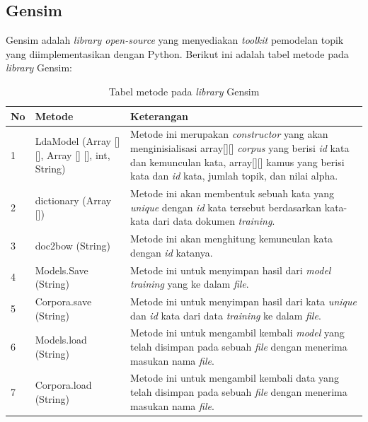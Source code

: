 \subsection{Gensim}
Gensim adalah \textit{library open-source} yang menyediakan \textit{
	toolkit }pemodelan topik yang diimplementasikan dengan Python. Berikut 
ini adalah tabel metode pada \textit{library} Gensim: 
\begin{table}[H]
	\caption{Tabel metode pada \textit{library} Gensim}
	\centering
	\small
	\begin{adjustbox}{width=1\textwidth}
	\begin{tabular}{|p{0.5cm}|p{6cm}|p{6cm}|}
		\hline
		\textbf{No} & \textbf{Metode} & \textbf{Keterangan} \\
		\hline
		1 & LdaModel (Array [] [], Array [] [], int, String) & 
		Metode ini merupakan \textit{constructor} yang akan menginisialisasi 
		array[][] \textit{corpus} yang berisi \textit{id} kata dan 
		kemunculan kata, array[][] kamus yang berisi kata dan \textit{
			id} kata, jumlah topik, dan nilai alpha. \\
		\hline
		2 & dictionary (Array []) & Metode ini akan membentuk sebuah kata 
		yang \textit{unique} dengan \textit{id} kata tersebut berdasarkan 
		kata-kata dari data dokumen \textit{training}. \\
		\hline
		3 & doc2bow (String) & Metode ini akan menghitung kemunculan kata dengan 
		\textit{id} katanya. \\
		\hline
		4 & Models.Save (String) & Metode ini untuk menyimpan hasil dari 
		\textit{model} \textit{training} yang ke dalam \textit{file}. \\
		\hline
		5 & Corpora.save (String) & Metode ini untuk menyimpan hasil dari kata 
		\textit{unique} dan \textit{id }kata dari data \textit{training }
		ke dalam \textit{file}. \\
		\hline
		6 & Models.load (String) & Metode ini untuk mengambil kembali \textit{
			model} yang telah disimpan pada sebuah \textit{file }dengan menerima 
		masukan nama \textit{file}. \\
		\hline
		7 & Corpora.load (String) & Metode ini untuk mengambil kembali data yang 
		telah disimpan pada sebuah \textit{file }dengan menerima masukan nama 
		\textit{file}. \\
		\hline
	\end{tabular}
	\end{adjustbox}
\end{table}

